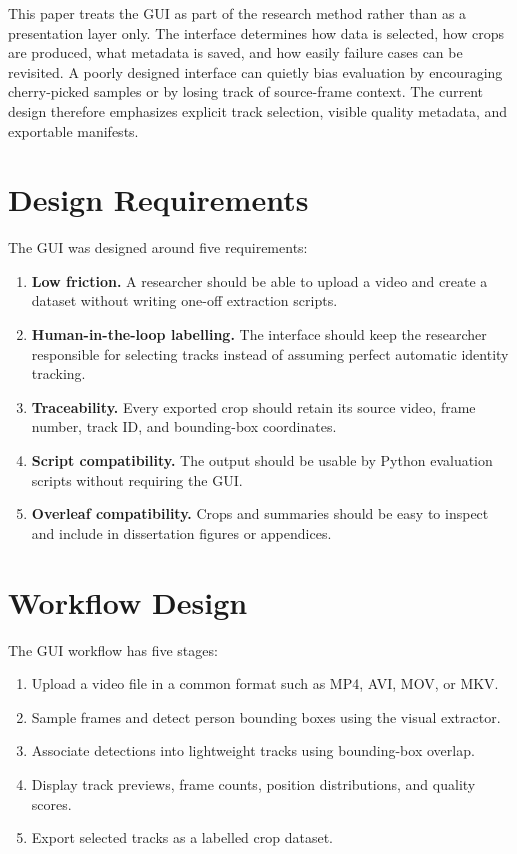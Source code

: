 This paper treats the GUI as part of the research method rather than as a presentation layer only. The interface determines how data is selected, how crops are produced, what metadata is saved, and how easily failure cases can be revisited. A poorly designed interface can quietly bias evaluation by encouraging cherry-picked samples or by losing track of source-frame context. The current design therefore emphasizes explicit track selection, visible quality metadata, and exportable manifests.

\section{Design Requirements}

The GUI was designed around five requirements:

\begin{enumerate}
  \item \textbf{Low friction.} A researcher should be able to upload a video and create a dataset without writing one-off extraction scripts.
  \item \textbf{Human-in-the-loop labelling.} The interface should keep the researcher responsible for selecting tracks instead of assuming perfect automatic identity tracking.
  \item \textbf{Traceability.} Every exported crop should retain its source video, frame number, track ID, and bounding-box coordinates.
  \item \textbf{Script compatibility.} The output should be usable by Python evaluation scripts without requiring the GUI.
  \item \textbf{Overleaf compatibility.} Crops and summaries should be easy to inspect and include in dissertation figures or appendices.
\end{enumerate}

\section{Workflow Design}

The GUI workflow has five stages:

\begin{enumerate}
  \item Upload a video file in a common format such as MP4, AVI, MOV, or MKV.
  \item Sample frames and detect person bounding boxes using the visual extractor.
  \item Associate detections into lightweight tracks using bounding-box overlap.
  \item Display track previews, frame counts, position distributions, and quality scores.
  \item Export selected tracks as a labelled crop dataset.
\end{enumerate}

